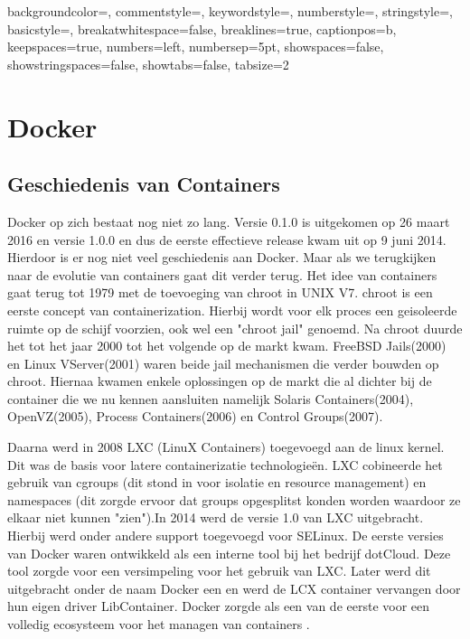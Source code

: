 
{
	backgroundcolor=\color{backcolour},   
	commentstyle=\color{codegreen},
	keywordstyle=\color{red},
	numberstyle=\tiny\color{codegray},
	stringstyle=\color{codepurple},
	basicstyle=\footnotesize,
	breakatwhitespace=false,         
	breaklines=true,                 
	captionpos=b,                    
	keepspaces=true,                 
	numbers=left,                    
	numbersep=5pt,                  
	showspaces=false,                
	showstringspaces=false,
	showtabs=false,                  
	tabsize=2
}


\chapter{Docker}
\section{Geschiedenis van Containers}
Docker op zich bestaat nog niet zo lang. Versie 0.1.0 is uitgekomen op 26 maart 2016 en versie 1.0.0 en dus de eerste effectieve release kwam uit op 9 juni 2014. Hierdoor is er nog niet veel geschiedenis aan Docker. Maar als we terugkijken naar de evolutie van containers gaat dit verder terug. 
Het idee van containers gaat terug tot 1979 met de toevoeging van chroot in UNIX V7. chroot is een eerste concept van containerization. Hierbij wordt voor elk proces een geisoleerde ruimte op de schijf voorzien, ook wel een "chroot jail" genoemd.
Na chroot duurde het tot het jaar 2000 tot het volgende op de markt kwam. FreeBSD Jails(2000) en Linux VServer(2001) waren beide jail mechanismen die verder bouwden op chroot. Hiernaa kwamen enkele oplossingen op de markt die al dichter bij de container die we nu kennen aansluiten namelijk Solaris Containers(2004), OpenVZ(2005), Process Containers(2006) en Control Groups(2007).

Daarna werd in 2008 LXC (LinuX Containers) toegevoegd aan de linux kernel. Dit was de basis voor latere containerizatie technologieën. LXC cobineerde het gebruik van cgroups (dit stond in voor isolatie en resource management) en namespaces (dit zorgde ervoor dat groups opgesplitst konden worden waardoor ze elkaar niet kunnen "zien")\cite{Ellingwood2015}.In 2014 werd de versie 1.0 van LXC uitgebracht. Hierbij werd onder andere support toegevoegd voor SELinux. De eerste versies van Docker waren ontwikkeld als een interne tool bij het bedrijf dotCloud. Deze tool zorgde voor een versimpeling voor het gebruik van LXC. Later werd dit uitgebracht onder de naam Docker een 	en werd de LCX container vervangen door hun eigen driver LibContainer. Docker zorgde als een van de eerste voor een volledig ecosysteem voor het managen van containers \cite{Gunaratne2016}.
 
